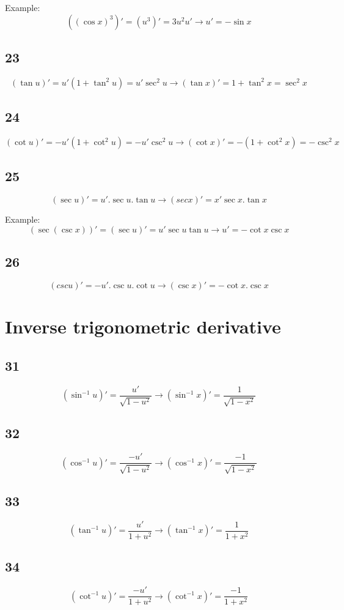 Example:
\[ ((\cos x)^3)' = (u^3)' = 3u^2u' \to u' = -\sin x \]

\subsection{23}
\[ (\tan u)' = u'(1+\tan^2u) = u'\sec^2u \to (\tan x)' = 1+\tan^2 x = \sec^2 x \]

\subsection{24}
\[ (\cot u)' = -u'(1+\cot^2u) = -u'\csc^2u \to (\cot x)' = -(1+\cot^2x) = -\csc^2x \]

\subsection{25}
\[ (\sec u)' = u'.\sec u.\tan u \to (sec x)' = x'\sec x.\tan x \]

Example:
\[ (\sec(\csc x))' = (\sec u)' = u'\sec u\tan u \to u' = -\cot x \csc x \]


\subsection{26}
\[ (csc u)' = -u'.\csc u.\cot u \to (\csc x)' = -\cot x.\csc x \]


\section{Inverse trigonometric derivative}
\subsection{31}
\[ (\sin^{-1} u)' = \frac{u'}{\sqrt{1-u^2}} \to (\sin^{-1}x)' = \frac{1}{\sqrt{1-x^2}} \]

\subsection{32}
\[ (\cos^{-1} u)' = \frac{-u'}{\sqrt{1-u^2}} \to (\cos^{-1}x)' = \frac{-1}{\sqrt{1-x^2}} \]

\subsection{33}
\[ (\tan^{-1} u)' = \frac{u'}{1+u^2} \to (\tan^{-1}x)' = \frac{1}{1+x^2} \]

\subsection{34}
\[ (\cot^{-1} u)' = \frac{-u'}{1+u^2} \to (\cot^{-1}x)' = \frac{-1}{1+x^2} \]

